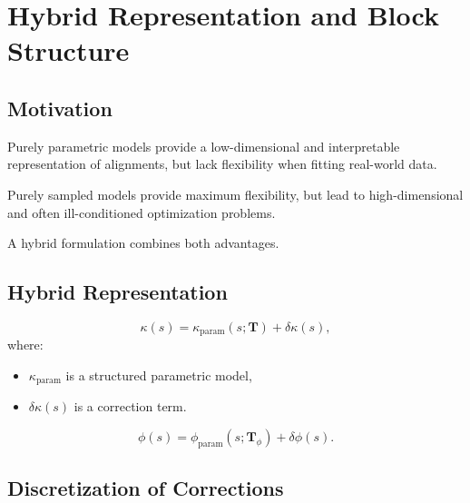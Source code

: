 
\section{Hybrid Representation and Block Structure}

\subsection{Motivation}

Purely parametric models provide a low-dimensional and interpretable
representation of alignments, but lack flexibility when fitting
real-world data.

Purely sampled models provide maximum flexibility, but lead to
high-dimensional and often ill-conditioned optimization problems.

A hybrid formulation combines both advantages.

\subsection{Hybrid Representation}

\begin{definition}
\[
\kappa(s)
=
\kappa_{\mathrm{param}}(s;\mathbf{T})
+
\delta\kappa(s),
\]
where:
\begin{itemize}
\item \(\kappa_{\mathrm{param}}\) is a structured parametric model,
\item \(\delta\kappa(s)\) is a correction term.
\end{itemize}
\end{definition}

\begin{definition}
\[
\phi(s)
=
\phi_{\mathrm{param}}(s;\mathbf{T}_\phi)
+
\delta\phi(s).
\]
\end{definition}

\subsection{Discretization of Corrections}

